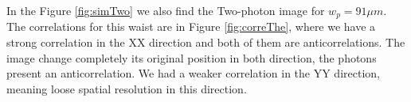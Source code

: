In the Figure \ref{fig:simTwo} we also find the Two-photon image for $w_p=91 \mu m$. The correlations for this waist are in Figure \ref{fig:correThe},
where we have a strong correlation in the XX direction and both of them are anticorrelations. The image change completely its original 
position in both direction, the photons present an anticorrelation. We had a weaker correlation in the YY direction, meaning loose spatial resolution in this direction.



